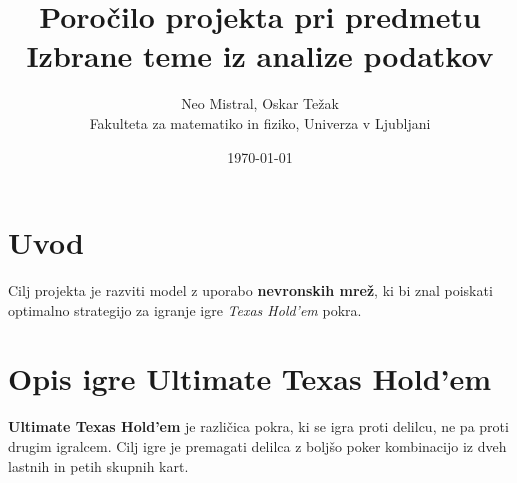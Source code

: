 \documentclass[a4paper,12pt]{article}
\title{Poročilo projekta pri predmetu Izbrane teme iz analize podatkov}
\author{Neo Mistral, Oskar Težak \\ Fakulteta za matematiko in fiziko, Univerza v Ljubljani}
\date{\today}
\begin{document}
\maketitle

\section{Uvod}

Cilj projekta je razviti model z uporabo \textbf{nevronskih mrež}, 
ki bi znal poiskati optimalno strategijo za igranje igre \textit{Texas Hold'em} pokra.
\section{Opis igre Ultimate Texas Hold'em}

\textbf{Ultimate Texas Hold'em} je različica pokra, ki se igra proti delilcu, 
ne pa proti drugim igralcem. Cilj igre je premagati delilca z boljšo 
poker kombinacijo iz dveh lastnih in petih skupnih kart.
\end{document}
